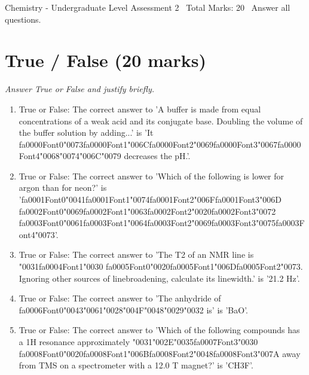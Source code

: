\documentclass[12pt]{article}
\begin{document}
\begin{center}
Chemistry - Undergraduate Level Assessment 2 \
Total Marks: 20 \
Answer all questions.
\end{center}

\section*{True / False (20 marks)}
\textit{Answer True or False and justify briefly.}
\begin{enumerate}[label=\arabic*.]
\item True or False: The correct answer to 'A buffer is made from equal concentrations of a weak acid and its conjugate base. Doubling the volume of the buffer solution by adding...' is 'It {\csname fa0000Font0\endcsname\char"0073}{\csname fa0000Font1\endcsname\char"006C}{\csname fa0000Font2\endcsname\char"0069}{\csname fa0000Font3\endcsname\char"0067}{\csname fa0000Font4\endcsname\char"0068}{\char"0074}{\char"006C}{\char"0079} decreases the pH.'.
\item True or False: The correct answer to 'Which of the following is lower for argon than for neon?' is '{\csname fa0001Font0\endcsname\char"0041}{\csname fa0001Font1\endcsname\char"0074}{\csname fa0001Font2\endcsname\char"006F}{\csname fa0001Font3\endcsname\char"006D} {\csname fa0002Font0\endcsname\char"0069}{\csname fa0002Font1\endcsname\char"0063}{\csname fa0002Font2\endcsname\char"0020}{\csname fa0002Font3\endcsname\char"0072} {\csname fa0003Font0\endcsname\char"0061}{\csname fa0003Font1\endcsname\char"0064}{\csname fa0003Font2\endcsname\char"0069}{\csname fa0003Font3\endcsname\char"0075}{\csname fa0003Font4\endcsname\char"0073}'.
\item True or False: The correct answer to 'The T2 of an NMR line is {\char"0031}{\csname fa0004Font1\endcsname\char"0030} {\csname fa0005Font0\endcsname\char"0020}{\csname fa0005Font1\endcsname\char"006D}{\csname fa0005Font2\endcsname\char"0073}. Ignoring other sources of linebroadening, calculate its linewidth.' is '21.2 Hz'.
\item True or False: The correct answer to 'The anhydride of {\csname fa0006Font0\endcsname\char"0043}{\char"0061}{\char"0028}{\char"004F}{\char"0048}{\char"0029}{\char"0032} is' is 'BaO'.
\item True or False: The correct answer to 'Which of the following compounds has a 1H resonance approximately {\char"0031}{\char"002E}{\char"0035}{\csname fa0007Font3\endcsname\char"0030} {\csname fa0008Font0\endcsname\char"0020}{\csname fa0008Font1\endcsname\char"006B}{\csname fa0008Font2\endcsname\char"0048}{\csname fa0008Font3\endcsname\char"007A} away from TMS on a spectrometer with a 12.0 T magnet?' is 'CH3F'.

\end{enumerate}
\end{document}
